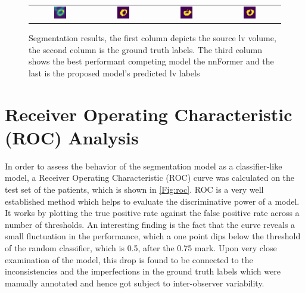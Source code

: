 \begin{figure}[htbp]
{\begin{tabular}{cccc}
\includegraphics[width=0.22\textwidth]{images/segs/sagittal_input.png} &
\includegraphics[width=0.22\textwidth]{images/segs/sagittal_gt.png} &
\includegraphics[width=0.22\textwidth]{images/segs/sagittal_pred.png}&
\includegraphics[width=0.22\textwidth]{images/segs/sagittal_pred_SP.png} \\
\end{tabular}
}
\caption{Segmentation results, the first column depicts the source \gls{lv} volume, the second column is the ground truth labels. The third column shows the best performant competing model the nnFormer and the last is the proposed model's predicted \gls{lv} labels}
\label{Fig:preds}
\end{figure}

\section{Receiver Operating Characteristic (ROC) Analysis}
In order to assess the behavior of the segmentation model as a classifier-like model, a Receiver Operating Characteristic (ROC) curve was calculated on the test set of the patients, which is shown in \cref{Fig:roc}. ROC is a very well established method which helps to evaluate the discriminative power of a model. It works by plotting the true positive rate against the false positive rate across a number of thresholds. An interesting finding is the fact that the curve reveals a small fluctuation in the performance, which a one point dips below the threshold of the random classifier, which is 0.5, after the 0.75 mark. Upon very close examination of the model, this drop is found to be connected to the inconsistencies and the imperfections in the ground truth labels which were manually annotated and hence got subject to inter-observer variability.

